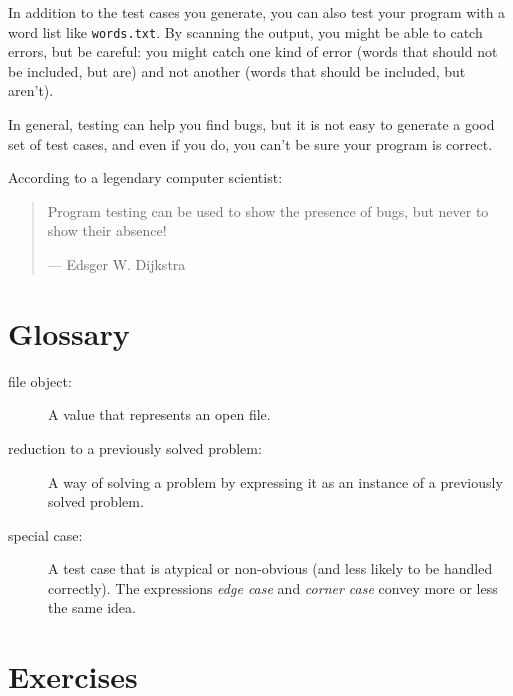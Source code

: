 In addition to the test cases you generate, you can also test
your program with a word list like {\tt words.txt}.  By scanning
the output, you might be able to catch errors, but be careful:
you might catch one kind of error (words that should not be
included, but are) and not another (words that should be included,
but aren't).

In general, testing can help you find bugs, but it is not easy to
generate a good set of test cases, and even if you do, you can't
be sure your program is correct.

According to a legendary computer scientist:

\begin{quote}
Program testing can be used to show the presence of bugs, 
but never to show their absence!

--- Edsger W. Dijkstra
\end{quote}


\section{Glossary}

\begin{description}

\item[file object:] A value that represents an open file.

\item[reduction to a previously solved problem:] A way of solving a
  problem by expressing it as an instance of a previously solved
  problem.

\item[special case:] A test case that is atypical or non-obvious
(and less likely to be handled correctly). The expressions   
\emph{edge case} and \emph{corner case} convey more or less 
the same idea.

\end{description}


\section{Exercises}

